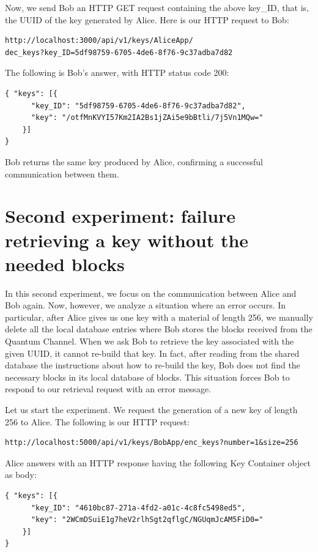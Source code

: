 Now, we send Bob an HTTP GET request containing the above key\_ID, that is, the UUID of the key generated by Alice. Here is our HTTP request to Bob:

\begin{verbatim}
http://localhost:3000/api/v1/keys/AliceApp/
dec_keys?key_ID=5df98759-6705-4de6-8f76-9c37adba7d82
\end{verbatim}

The following is Bob's answer, with HTTP status code 200:
\begin{verbatim}
{ "keys": [{
      "key_ID": "5df98759-6705-4de6-8f76-9c37adba7d82",
      "key": "/otfMnKVYI57Km2IA2Bs1jZAi5e9bBtli/7j5Vn1MQw="
    }]
}
\end{verbatim}

Bob returns the same key produced by Alice, confirming a successful communication between them.

\section{Second experiment: failure retrieving a key without the needed blocks}
In this second experiment, we focus on the communication between Alice and Bob again. Now, however, we analyze a situation where an error occurs. In particular, after Alice gives us one key with a material of length 256, we manually delete all the local database entries where Bob stores the blocks received from the Quantum Channel. When we ask Bob to retrieve the key associated with the given UUID, it cannot re-build that key. In fact, after reading from the shared database the instructions about how to re-build the key, Bob does not find the necessary blocks in its local database of blocks. This situation forces Bob to respond to our retrieval request with an error message.

Let us start the experiment. We request the generation of a new key of length 256 to Alice. The following is our HTTP request:

\begin{verbatim}
http://localhost:5000/api/v1/keys/BobApp/enc_keys?number=1&size=256
\end{verbatim}

Alice answers with an HTTP response having the following Key Container object as body:

\begin{verbatim}
{ "keys": [{
      "key_ID": "4610bc87-271a-4fd2-a01c-4c8fc5498ed5",
      "key": "2WCmDSuiE1g7heV2rlhSgt2qflgC/NGUqmJcAM5FiD0="
    }]
}
\end{verbatim}

